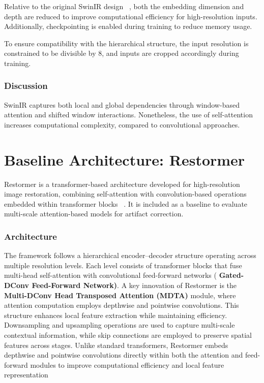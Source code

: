 Relative to the original SwinIR design ~\cite{liang2021swinir}, both the embedding dimension and depth are reduced to improve computational efficiency for high-resolution inputs. Additionally, checkpointing is enabled during training to reduce memory usage.

To ensure compatibility with the hierarchical structure, the input resolution is constrained to be divisible by 8, and inputs are cropped accordingly during training.

\subsubsection{Discussion}

SwinIR captures both local and global dependencies through window-based attention and shifted window interactions. Nonetheless, the use of self-attention increases computational complexity, compared to convolutional approaches.


\section{Baseline Architecture: Restormer}

Restormer is a transformer-based architecture developed for high-resolution image restoration, combining self-attention with convolution-based operations embedded within transformer blocks ~\cite{restormer2022}. It is included as a baseline to evaluate multi-scale attention-based models for artifact correction.

\subsubsection{Architecture}

The framework follows a hierarchical encoder--decoder structure operating across multiple resolution levels. Each level consists of transformer blocks that fuse multi-head self-attention with convolutional feed-forward networks ( \textbf{Gated-DConv Feed-Forward Network)}. 
A key innovation of Restormer is the \textbf{Multi-DConv Head Transposed Attention (MDTA)} module, where attention computation employs depthwise and pointwise convolutions. This structure enhances local feature extraction while maintaining efficiency. 
Downsampling and upsampling operations are used to capture multi-scale contextual information, while skip connections are employed to preserve spatial features across stages.
Unlike standard transformers, Restormer embeds depthwise and pointwise convolutions directly within both the attention and feed-forward modules to improve computational efficiency and local feature representation 

